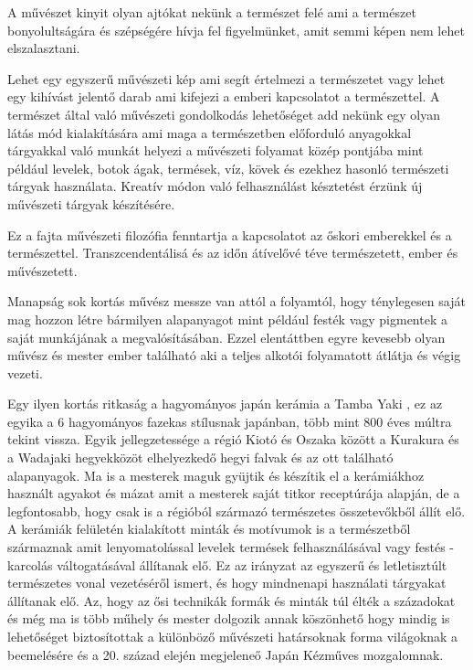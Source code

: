 \documentclass[fontsize=12pt, appendixprefix=true]{scrreprt}
\begin{document}
A művészet kinyit olyan ajtókat nekünk a természet felé ami a természet  bonyolultságára és szépségére hívja fel figyelmünket, amit semmi képen nem lehet elszalasztani.

Lehet egy egyszerű művészeti kép ami segít értelmezi a természetet vagy lehet egy kihívást jelentő darab ami kifejezi a emberi kapcsolatot a természettel.
A természet által való művészeti gondolkodás lehetőséget add nekünk egy olyan látás mód kialakítására ami maga a természetben előforduló anyagokkal tárgyakkal való munkát helyezi a művészeti folyamat közép pontjába mint például levelek, botok ágak, termések, víz, kövek és ezekhez hasonló természeti tárgyak használata.
Kreatív módon való felhasználást késztetést érzünk új művészeti tárgyak készítésére.

Ez a fajta művészeti filozófia fenntartja a kapcsolatot az őskori emberekkel és a természettel. Transzcendentálisá és az időn átívelővé téve természetett, ember és művészetett.

Manapság sok kortás művész messze van attól a folyamtól, hogy ténylegesen saját mag hozzon létre bármilyen alapanyagot mint például festék vagy pigmentek a saját munkájának a megvalósításában. Ezzel elentáttben egyre kevesebb olyan művész és mester ember található aki a teljes alkotói folyamatott átlátja és végig vezeti.

\vspace{3 mm}
Egy ilyen kortás ritkaság a hagyományos japán kerámia a Tamba Yaki \cite{tambayaki}, ez az  egyika a 6 hagyományos fazekas stílusnak japánban, több mint 800 éves múltra tekint vissza. Egyik jellegzetessége a régió Kiotó és Oszaka között a Kurakura és a Wadajaki hegyekközöt elhelyezkedő hegyi falvak és az ott található alapanyagok. Ma is a mesterek maguk gyüjtik és készítik el a kerámiákhoz használt agyakot és mázat amit a mesterek saját titkor receptúrája alapján, de a legfontosabb, hogy csak is a régióból származó természetes összetevőkből állít elő. A kerámiák felületén kialakított minták és motívumok is a természetből származnak amit lenyomatolással levelek termések felhasználásával vagy festés - karcolás váltogatásával állítanak elő. Ez az irányzat az egyszerű és letletisztúlt természetes vonal vezetéséről ismert, és hogy mindnenapi használati tárgyakat állítanak elő. Az, hogy az ősi technikák formák és minták túl élték a századokat és még ma is több műhely és mester dolgozik annak köszönhető hogy mindig is lehetőséget biztosítottak a különböző művészeti határsoknak forma világoknak a beemelésére és a 20. század elején megjeleneő Japán Kézműves mozgalomnak.
\end{document}

